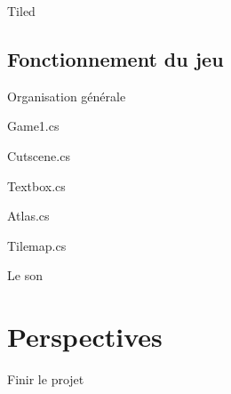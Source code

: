 \documentclass{beamer}
\begin{document}
\begin{frame}{Tiled}
  
\end{frame}

\subsection{Fonctionnement du jeu}

\begin{frame}{Organisation générale}
  
\end{frame}

\begin{frame}{Game1.cs}
  
\end{frame}

\begin{frame}{Cutscene.cs}
  
\end{frame}

\begin{frame}{Textbox.cs}
  
\end{frame}

\begin{frame}{Atlas.cs}
  
\end{frame}

\begin{frame}{Tilemap.cs}
  
\end{frame}

\begin{frame}{Le son}
  
\end{frame}

\section{Perspectives}

\begin{frame}{Finir le projet}
  
\end{frame}
\end{document}
